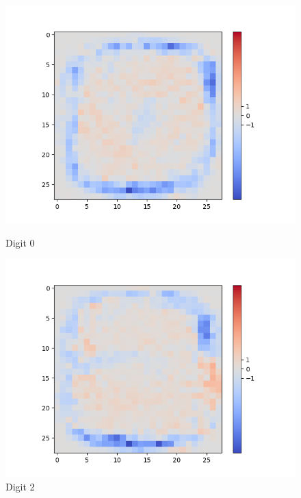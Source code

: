 \begin{figure}[H]
	\centering
	\begin{minipage}[b]{0.19\textwidth}
		\captionsetup{labelformat=empty}
		\includegraphics[width=\textwidth]{Sigmoid(NO-Hidden)/Layer0-Neuron-0.png}
		\caption{Digit 0}
	\end{minipage}
	\begin{minipage}[b]{0.19\textwidth}
		\captionsetup{labelformat=empty}
		\includegraphics[width=\textwidth]{Sigmoid(NO-Hidden)/Layer0-Neuron-2.png}
		\caption{Digit 2}
	\end{minipage}
	\begin{minipage}[b]{0.19\textwidth}
		\captionsetup{labelformat=empty}

\end{minipage}
\end{figure}
